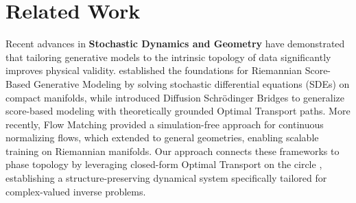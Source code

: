 \section{Related Work}
\label{sec:related_work}

Recent advances in \textbf{Stochastic Dynamics and Geometry} have demonstrated that tailoring generative models to the intrinsic topology of data significantly improves physical validity. \citet{debortoli2022riemannian} established the foundations for Riemannian Score-Based Generative Modeling by solving stochastic differential equations (SDEs) on compact manifolds, while \citet{debortoli2021diffusion} introduced Diffusion Schr{\"o}dinger Bridges to generalize score-based modeling with theoretically grounded Optimal Transport paths. More recently, Flow Matching \citep{lipman2023flow} provided a simulation-free approach for continuous normalizing flows, which \citet{chen2024flow} extended to general geometries, enabling scalable training on Riemannian manifolds. Our approach connects these frameworks to phase topology by leveraging closed-form Optimal Transport on the circle \citep{delon2010fast}, establishing a structure-preserving dynamical system specifically tailored for complex-valued inverse problems.
